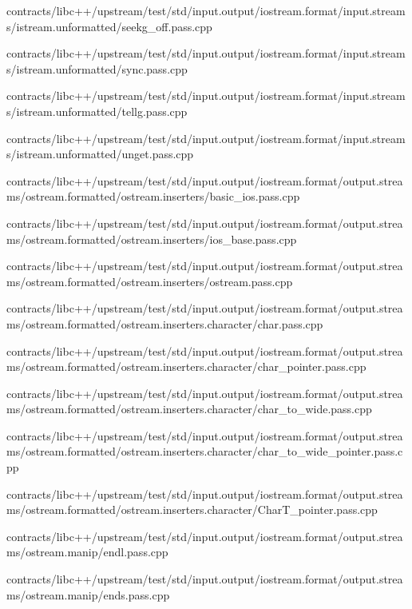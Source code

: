 \begin{DoxyCompactItemize}
contracts/libc++/upstream/test/std/input.\+output/iostream.\+format/input.\+streams/istream.\+unformatted/seekg\+\_\+off.\+pass.\+cpp\item 
contracts/libc++/upstream/test/std/input.\+output/iostream.\+format/input.\+streams/istream.\+unformatted/sync.\+pass.\+cpp\item 
contracts/libc++/upstream/test/std/input.\+output/iostream.\+format/input.\+streams/istream.\+unformatted/tellg.\+pass.\+cpp\item 
contracts/libc++/upstream/test/std/input.\+output/iostream.\+format/input.\+streams/istream.\+unformatted/unget.\+pass.\+cpp\item 
contracts/libc++/upstream/test/std/input.\+output/iostream.\+format/output.\+streams/ostream.\+formatted/ostream.\+inserters/basic\+\_\+ios.\+pass.\+cpp\item 
contracts/libc++/upstream/test/std/input.\+output/iostream.\+format/output.\+streams/ostream.\+formatted/ostream.\+inserters/ios\+\_\+base.\+pass.\+cpp\item 
contracts/libc++/upstream/test/std/input.\+output/iostream.\+format/output.\+streams/ostream.\+formatted/ostream.\+inserters/ostream.\+pass.\+cpp\item 
contracts/libc++/upstream/test/std/input.\+output/iostream.\+format/output.\+streams/ostream.\+formatted/ostream.\+inserters.\+character/char.\+pass.\+cpp\item 
contracts/libc++/upstream/test/std/input.\+output/iostream.\+format/output.\+streams/ostream.\+formatted/ostream.\+inserters.\+character/char\+\_\+pointer.\+pass.\+cpp\item 
contracts/libc++/upstream/test/std/input.\+output/iostream.\+format/output.\+streams/ostream.\+formatted/ostream.\+inserters.\+character/char\+\_\+to\+\_\+wide.\+pass.\+cpp\item 
contracts/libc++/upstream/test/std/input.\+output/iostream.\+format/output.\+streams/ostream.\+formatted/ostream.\+inserters.\+character/char\+\_\+to\+\_\+wide\+\_\+pointer.\+pass.\+cpp\item 
contracts/libc++/upstream/test/std/input.\+output/iostream.\+format/output.\+streams/ostream.\+formatted/ostream.\+inserters.\+character/Char\+T\+\_\+pointer.\+pass.\+cpp\item 
contracts/libc++/upstream/test/std/input.\+output/iostream.\+format/output.\+streams/ostream.\+manip/endl.\+pass.\+cpp\item 
contracts/libc++/upstream/test/std/input.\+output/iostream.\+format/output.\+streams/ostream.\+manip/ends.\+pass.\+cpp\item 

\end{DoxyCompactItemize}

